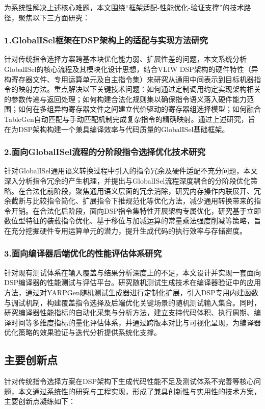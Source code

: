 为系统性解决上述核心难题，本文围绕“框架适配-性能优化-验证支撑”的技术路径，聚焦以下三方面研究：


\subsubsection{1.GlobalISel框架在DSP架构上的适配与实现方法研究}
针对传统指令选择方案跨基本块优化能力弱、扩展性差的问题，本文系统分析GlobalISel的核心流程及其模块化设计思想，结合VLIW DSP架构的硬件特性（异构寄存器文件、专用运算单元及自主指令集）来研究从通用中间表示到目标机器指令的映射方法。重点解决以下关键技术问题：如何通过定制调用约定实现架构相关的参数传递与返回处理；如何构建合法化规则集以确保指令语义落入硬件能力范围；如何在多组异构寄存器文件之间建立代价驱动的寄存器组选择模型；如何融合TableGen自动匹配与手动匹配机制完成复杂指令的精确映射。通过上述研究，旨在为DSP架构构建一个兼具编译效率与代码质量的GlobalISel基础框架。


\subsubsection{2.面向GlobalISel流程的分阶段指令选择优化技术研究}
针对GlobalISel通用语义转换过程中引入的指令冗余及硬件适配不充分问题，本文深入分析指令冗余的产生机理，并提出与GlobalISel流程深度耦合的分阶段优化策略。在合法化前阶段，聚焦通用语义层面的冗余消除，研究内存操作内联展开、冗余截断与比较指令简化、扩展指令下推规范化等优化方法，减少通用转换带来的指令开销。在合法化后阶段，面向DSP指令集特性开展架构专属优化，研究基于立即数位型特征的装载指令优化、基于移位与加减运算的常量乘法强度削减等策略，旨在充分挖掘硬件专用运算单元的潜力，提升生成代码的执行效率与存储密度。


\subsubsection{3.面向编译器后端优化的性能评估体系研究}
针对现有测试体系在输入覆盖与结果分析深度上的不足，本文设计并实现一套面向DSP编译器的性能测试与评估平台。研究随机测试生成技术在编译器验证中的应用方法，通过对YARPGen随机测试生成器进行定制化扩展，引入DSP专用内建函数与调试机制，构建覆盖指令选择及后端优化关键场景的随机测试输入集合。同时，研究编译器性能指标的自动化采集与分析方法，建立支持代码体积、执行周期、编译时间等多维度指标的量化评估体系，并通过跨版本对比与可视化呈现，为编译器优化策略的效果验证与迭代分析提供系统化支撑。


\subsection{主要创新点}
针对传统指令选择方案在DSP架构下生成代码性能不足及测试体系不完善等核心问题，本文通过系统性的研究与工程实现，形成了兼具创新性与实用性的技术方案，主要创新点凝练如下：


